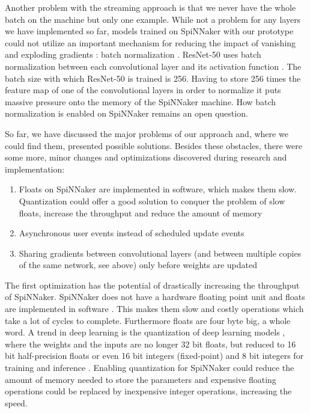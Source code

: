 \documentclass[]{article}
\begin{document}
Another problem with the streaming approach is that we never have the
whole batch on the machine but only one example.
While not a problem for any layers we have implemented so far,
models trained on SpiNNaker with our prototype could not utilize an
important mechanism for reducing the impact of vanishing and exploding
gradients \citep{bengio_et_al_1994, glorot_et_al_2010,
  brownlee_2019a}: batch normalization \citep{ioffe_et_al_2015}.
ResNet-50 uses batch normalization between each convolutional layer
and its activation function \citep{he_et_al_2015}.
The batch size with which ResNet-50 is trained is 256.
Having to store 256 times the feature map of one of the convolutional
layers in order to normalize it puts massive pressure onto the memory
of the SpiNNaker machine.
How batch normalization is enabled on SpiNNaker remains an open
question.

So far, we have discussed the major problems of our approach and,
where we could find them, presented possible solutions.
Besides these obstacles, there were some more, minor changes and
optimizations discovered during research and implementation:
\begin{enumerate}
  \item Floats on SpiNNaker are implemented in software, which makes
    them slow. Quantization \citep{praveen_2020} could offer a good
    solution to conquer the problem of slow floats, increase the
    throughput and reduce the amount of memory
  \item Asynchronous user events instead of scheduled update events
  \item Sharing gradients between convolutional layers (and between
    multiple copies of the same network, see above) only before
    weights are updated
\end{enumerate}

The first optimization has the potential of drastically increasing
the throughput of SpiNNaker.
SpiNNaker does not have a hardware floating point unit and floats are
implemented in software \citep{furber_et_al_2020}.
This makes them slow and costly operations which take a lot of cycles
to complete.
Furthermore floats are four byte big, a whole word.
A trend in deep learning is the quantization of deep learning models
\citep{praveen_2020}, where the weights and the inputs are no longer
32 bit floats, but reduced to 16 bit half-precision floats or even
16 bit integers (fixed-point) and 8 bit integers for training and
inference \citep{das_et_al_2018}.
Enabling quantization for SpiNNaker could reduce the amount of memory
needed to store the parameters and expensive floating operations
could be replaced by inexpensive integer operations, increasing the
speed.
\end{document}
